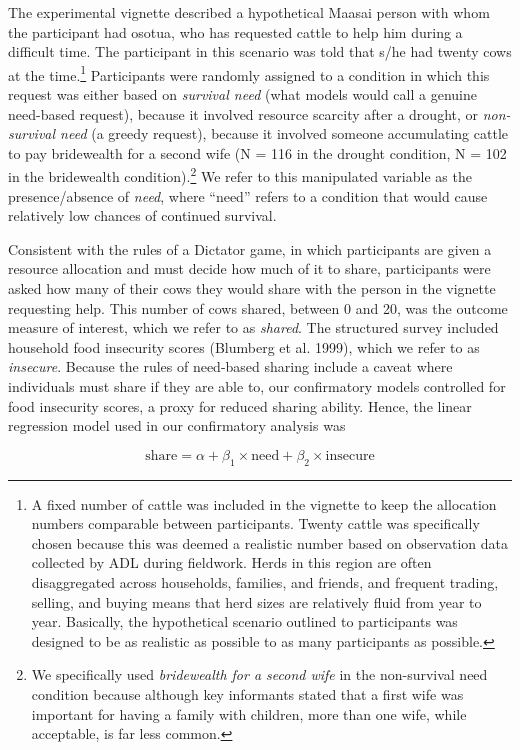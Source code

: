 \documentclass[
]{article}
\begin{document}
The experimental vignette described a hypothetical Maasai person with whom the participant had osotua, who has requested cattle to help him during a difficult time. The participant in this scenario was told that s/he had twenty cows at the time.\footnote{A fixed number of cattle was included in the vignette to keep the allocation numbers comparable between participants. Twenty cattle was specifically chosen because this was deemed a realistic number based on observation data collected by ADL during fieldwork. Herds in this region are often disaggregated across households, families, and friends, and frequent trading, selling, and buying means that herd sizes are relatively fluid from year to year. Basically, the hypothetical scenario outlined to participants was designed to be as realistic as possible to as many participants as possible.} Participants were randomly assigned to a condition in which this request was either based on \emph{survival need} (what models would call a genuine need-based request), because it involved resource scarcity after a drought, or \emph{non-survival need} (a greedy request), because it involved someone accumulating cattle to pay bridewealth for a second wife (N = 116 in the drought condition, N = 102 in the bridewealth condition).\footnote{We specifically used \emph{bridewealth for a second wife} in the non-survival need condition because although key informants stated that a first wife was important for having a family with children, more than one wife, while acceptable, is far less common.} We refer to this manipulated variable as the presence/absence of \emph{need}, where ``need'' refers to a condition that would cause relatively low chances of continued survival.

Consistent with the rules of a Dictator game, in which participants are given a resource allocation and must decide how much of it to share, participants were asked how many of their cows they would share with the person in the vignette requesting help. This number of cows shared, between 0 and 20, was the outcome measure of interest, which we refer to as \emph{shared}. The structured survey included household food insecurity scores (Blumberg et al. 1999), which we refer to as \emph{insecure}. Because the rules of need-based sharing include a caveat where individuals must share if they are able to, our confirmatory models controlled for food insecurity scores, a proxy for reduced sharing ability. Hence, the linear regression model used in our confirmatory analysis was

\[
\text{share} = \alpha + \beta_1 \times \text{need} + \beta_2 \times \text{insecure}
\]
\end{document}

